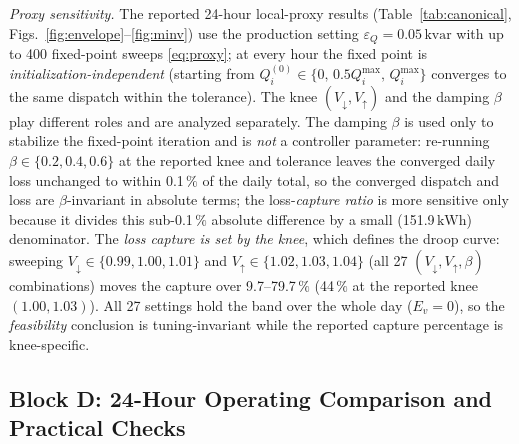 \documentclass{ieeeaccess}
\providecommand{\percent}{\%}
\newcommand{\num}[1]{#1}
\newcommand{\SI}[2]{#1\,\ensuremath{\mathrm{#2}}}
\newcommand{\SIrange}[3]{#1\mbox{--}#2\,\ensuremath{\mathrm{#3}}}
\newcommand{\kvar}{\text{kvar}}
\newcommand{\Qmax}{Q^{\max}}
\begin{document}
\emph{Proxy sensitivity.} The reported 24-hour local-proxy results
(Table~\ref{tab:canonical}, Figs.~\ref{fig:envelope}--\ref{fig:minv}) use the
production setting $\varepsilon_Q=\SI{0.05}{\kvar}$ with up to 400 fixed-point sweeps
\eqref{eq:proxy}; at every hour the fixed point is \emph{initialization-independent}
(starting from $Q_i^{(0)}\in\{0,\,0.5\Qmax_i,\,\Qmax_i\}$ converges to the same
dispatch within the tolerance). The knee $(V_\downarrow,V_\uparrow)$ and the damping
$\beta$ play different roles and are analyzed separately. The damping $\beta$ is used
only to stabilize the fixed-point iteration and is \emph{not} a controller parameter:
re-running $\beta\in\{0.2,0.4,0.6\}$ at the reported knee and tolerance leaves the
converged daily loss unchanged to within \SI{0.1}{\percent} of the daily total, so
the converged dispatch and loss are $\beta$-invariant in absolute terms; the
loss-\emph{capture ratio} is more sensitive only because it divides this
sub-\SI{0.1}{\percent} absolute difference by a small (\SI{151.9}{kWh}) denominator.
The \emph{loss capture is set by the knee}, which defines the droop curve:
sweeping $V_\downarrow\in\{0.99,1.00,1.01\}$ and $V_\uparrow\in\{1.02,1.03,1.04\}$
(all \num{27} $(V_\downarrow,V_\uparrow,\beta)$ combinations) moves the capture over
\SIrange{9.7}{79.7}{\percent} (\SI{44}{\percent} at the reported knee
$(1.00,1.03)$). All 27 settings hold the band over the whole day ($E_v=0$), so the
\emph{feasibility} conclusion is tuning-invariant while the reported capture
percentage is knee-specific.

\subsection{Block D: 24-Hour Operating Comparison and Practical Checks}
\label{sec:blockD}
\end{document}
